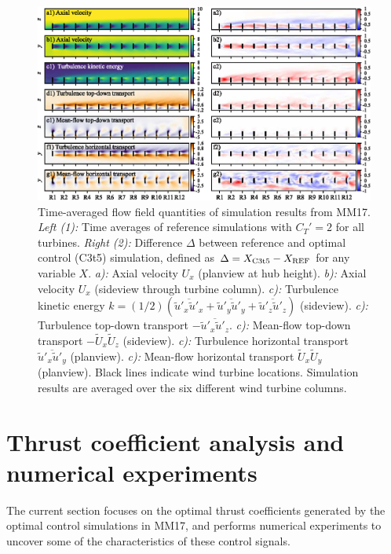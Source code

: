 \documentclass[wes, manuscript]{copernicus}
\begin{document}
\begin{figure}
	\includegraphics[width=\textwidth]{statfig_initial.eps}
	\caption{Time-averaged flow field quantities of simulation results from MM17. \emph{Left (1):} Time averages of reference simulations with $C_T' = 2$ for all turbines. \emph{Right (2):} Difference $\Delta$ between reference and optimal control (C3t5) simulation, defined as $\Delta = X_{\rm C3t5} - X_{\rm REF}$ for any variable $X$. \emph{a):} Axial velocity $U_x$ (planview at hub height). \emph{b):} Axial velocity $U_x$ (sideview through turbine column). \emph{c):} Turbulence kinetic energy $k = (1/2)(\overline{\widetilde{u}'_x \widetilde{u}'_x} + \overline{\widetilde{u}'_y \widetilde{u}'_y} + \overline{\widetilde{u}'_z \widetilde{u}'_z})$ (sideview). \emph{c):} Turbulence top-down transport $ - \overline{\widetilde{u}'_x\widetilde{u}'_z}$. \emph{c):} Mean-flow top-down transport $ - \widetilde{U}_x \widetilde{U}_z$ (sideview). \emph{c):} Turbulence horizontal transport $\overline{\widetilde{u}'_x \widetilde{u}'_y}$ (planview). \emph{c):} Mean-flow horizontal transport $\widetilde{U}_x \widetilde{U}_y$ (planview). Black lines indicate wind turbine locations. Simulation results are averaged over the six different wind turbine columns. \label{fig:flowfield_statistics}}
\end{figure}


\section{Thrust coefficient analysis and numerical experiments}\label{sec:analysis_controls_analysis}

The current section focuses on the optimal thrust coefficients generated by the optimal control simulations in MM17, and performs numerical experiments to uncover some of the characteristics of these control signals. 
\end{document}
